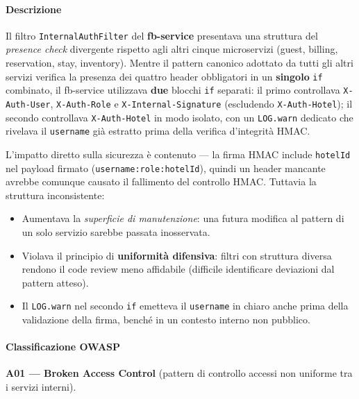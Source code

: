 ﻿\documentclass[a4paper,12pt]{report}
\begin{document}
\paragraph{Descrizione}
Il filtro \texttt{InternalAuthFilter} del \textbf{fb-service} presentava una
struttura del \emph{presence check} divergente rispetto agli altri cinque
microservizi (guest, billing, reservation, stay, inventory).
Mentre il pattern canonico adottato da tutti gli altri servizi verifica la
presenza dei quattro header obbligatori in un \textbf{singolo} \texttt{if}
combinato, il fb-service utilizzava \textbf{due} blocchi \texttt{if} separati:
il primo controllava \texttt{X-Auth-User}, \texttt{X-Auth-Role} e
\texttt{X-Internal-Signature} (escludendo \texttt{X-Auth-Hotel}); il secondo
controllava \texttt{X-Auth-Hotel} in modo isolato, con un \texttt{LOG.warn}
dedicato che rivelava il \texttt{username} già estratto prima della verifica
d'integrità HMAC.

\noindent
L'impatto diretto sulla sicurezza è contenuto — la firma HMAC include
\texttt{hotelId} nel payload firmato (\texttt{username:role:hotelId}),
quindi un header mancante avrebbe comunque causato il fallimento del controllo
HMAC. Tuttavia la struttura inconsistente:
\begin{itemize}
  \item Aumentava la \emph{superficie di manutenzione}: una futura modifica al
        pattern di un solo servizio sarebbe passata inosservata.
  \item Violava il principio di \textbf{uniformità difensiva}: filtri con
        struttura diversa rendono il code review meno affidabile
        (difficile identificare deviazioni dal pattern atteso).
  \item Il \texttt{LOG.warn} nel secondo \texttt{if} emetteva il \texttt{username}
        in chiaro anche prima della validazione della firma, benché in un contesto
        interno non pubblico.
\end{itemize}

\paragraph{Classificazione OWASP}
\textbf{A01 --- Broken Access Control} (pattern di controllo accessi
non uniforme tra i servizi interni).
\end{document}
